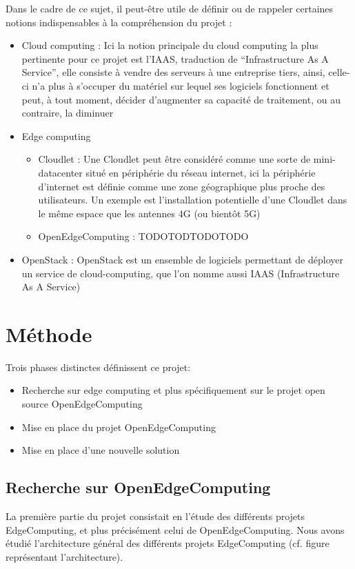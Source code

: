 \documentclass[twocolumn,a4paper]{IEEEtranfr}
\begin{document}
Dans le cadre de ce sujet, il peut-être utile de définir ou de rappeler certaines notions indispensables à la compréhension du projet : 
\begin{itemize}
\item Cloud computing : 
Ici la notion principale du cloud computing la plus pertinente pour ce projet est l’IAAS, traduction de “Infrastructure As A Service”, elle consiste à vendre des serveurs à une entreprise tiers, ainsi, celle-ci n’a plus à s’occuper du matériel sur lequel ses logiciels fonctionnent et peut, à tout moment, décider d’augmenter sa capacité de traitement, ou au contraire, la diminuer 
\item Edge computing
\begin{itemize}
\item Cloudlet : 
Une Cloudlet peut être considéré comme une sorte de mini-datacenter situé en périphérie du réseau internet, ici la périphérie d’internet est définie comme une zone géographique plus proche des utilisateurs. Un exemple est l’installation potentielle d’une Cloudlet dans le même espace que les antennes 4G (ou bientôt 5G)
\item OpenEdgeComputing : 
TODOTODTODOTODO
\end{itemize}
\item OpenStack : 
OpenStack est un ensemble de logiciels permettant de déployer un service de cloud-computing, que l’on nomme aussi IAAS (Infrastructure As A Service)
\end{itemize}

\section{Méthode} 

Trois phases distinctes définissent ce projet: 

\begin{itemize}
\item Recherche sur edge computing et plus spécifiquement sur le projet open source OpenEdgeComputing
\item Mise en place du projet OpenEdgeComputing
\item Mise en place d'une nouvelle solution
\end{itemize}

\subsection{Recherche sur OpenEdgeComputing}

La première partie du projet consistait en l’étude des différents projets EdgeComputing, et plus précisément celui de OpenEdgeComputing. Nous avons étudié l’architecture général des différents projets EdgeComputing (cf. figure représentant l’architecture).
\end{document}
